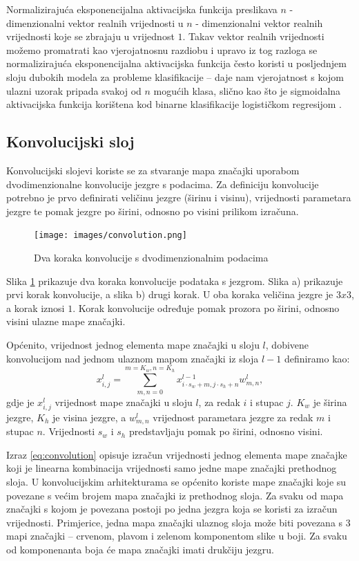 \documentclass[times, utf8, diplomski, numeric]{fer}
\begin{document}
Normalizirajuća eksponencijalna aktivacijska funkcija preslikava $n$ - dimenzionalni vektor realnih vrijednosti u $n$ - dimenzionalni vektor realnih vrijednosti koje se zbrajaju u vrijednost $1$.
Takav vektor realnih vrijednosti možemo promatrati kao vjerojatnosnu razdiobu i upravo iz tog razloga se normalizirajuća eksponencijalna aktivacijska funkcija često koristi u posljednjem sloju dubokih modela za probleme klasifikacije -- daje nam vjerojatnost s kojom ulazni uzorak pripada svakoj od $n$ mogućih klasa, slično kao što je sigmoidalna aktivacijska funkcija korištena kod binarne klasifikacije logističkom regresijom \citep{seminar:rela}.

\subsection{Konvolucijski sloj}
Konvolucijski slojevi koriste se za stvaranje mapa značajki uporabom dvodimenzionalne konvolucije jezgre s podacima.
Za definiciju konvolucije potrebno je prvo definirati veličinu jezgre (širinu i visinu), vrijednosti parametara jezgre te pomak jezgre po širini, odnosno po visini prilikom izračuna.
\begin{figure}[H]
\centering
\texttt{[image: images/convolution.png]}
\caption{Dva koraka konvolucije s dvodimenzionalnim podacima}
\label{img:convolution}
\end{figure}
Slika \ref{img:convolution} prikazuje dva koraka konvolucije podataka s jezgrom. Slika a) prikazuje prvi korak konvolucije, a slika b) drugi korak. 
U oba koraka veličina jezgre je $3x3$, a korak iznosi $1$. 
Korak konvolucije  određuje pomak prozora po širini, odnosno visini ulazne mape značajki. 

Općenito, vrijednost jednog elementa mape značajki u sloju $l$, dobivene konvolucijom nad jednom ulaznom mapom značajki iz sloja $l-1$ definiramo kao:
\begin{equation}
 x^l_{i,j}=\sum_{m,n=0}^{m=K_w,n=K_h}x^{l-1}_{i \cdot s_w +m, j \cdot s_h +n} w^l_{m, n}, \label{eq:convolution}
\end{equation}
gdje je $x_{i,j}^l$ vrijednost mape značajki u sloju $l$, za redak $i$ i stupac $j$. $K_w$ je širina jezgre, $K_h$ je visina jezgre, a $w^l_{m,n}$ vrijednost parametara jezgre za redak $m$ i stupac $n$.
Vrijednosti $s_w$ i $s_h$ predstavljaju pomak po širini, odnosno visini.

Izraz \ref{eq:convolution} opisuje izračun vrijednosti jednog elementa mape značajke koji je linearna kombinacija vrijednosti samo jedne mape značajki prethodnog sloja.
U konvolucijskim arhitekturama se općenito koriste mape značajki koje su povezane s većim brojem mapa značajki iz prethodnog sloja.
Za svaku od mapa značajki s kojom je povezana postoji po jedna jezgra koja se koristi za izračun vrijednosti.
Primjerice, jedna mapa značajki ulaznog sloja može biti povezana s 3 mapi značajki -- crvenom, plavom i zelenom komponentom slike u boji.
Za svaku od komponenanta boja će mapa značajki imati drukčiju jezgru.
\end{document}

